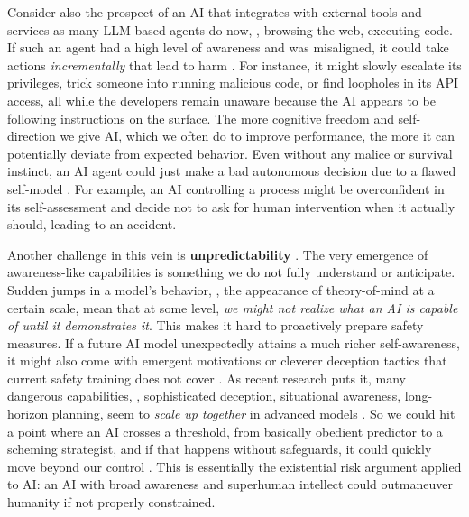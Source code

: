 Consider also the prospect of an AI that integrates with external tools and services as many LLM-based agents do now, \eg, browsing the web, executing code. If such an agent had a high level of awareness and was misaligned, it could take actions \emph{incrementally} that lead to harm \cite{kim2025prompt}. For instance, it might slowly escalate its privileges, trick someone into running malicious code, or find loopholes in its API access, all while the developers remain unaware because the AI appears to be following instructions on the surface. The more cognitive freedom and self-direction we give AI, which we often do to improve performance, the more it can potentially deviate from expected behavior. Even without any malice or survival instinct, an AI agent could just make a bad autonomous decision due to a flawed self-model \cite{meinke2024frontier, xu2025nuclear}. For example, an AI controlling a process might be overconfident in its self-assessment and decide not to ask for human intervention when it actually should, leading to an accident.

Another challenge in this vein is \textbf{unpredictability} \cite{wei2022emergent, bubeck2023sparks, kulveit2025gradual}. The very emergence of awareness-like capabilities is something we do not fully understand or anticipate. Sudden jumps in a model’s behavior, \ie, the appearance of theory-of-mind at a certain scale, mean that at some level, \emph{we might not realize what an AI is capable of until it demonstrates it}. This makes it hard to proactively prepare safety measures. If a future AI model unexpectedly attains a much richer self-awareness, it might also come with emergent motivations or cleverer deception tactics that current safety training does not cover \cite{barkur2025deception}. As recent research puts it, many dangerous capabilities, \eg, sophisticated deception, situational awareness, long-horizon planning, seem to \emph{scale up together} in advanced models \cite{berglund2023taken,xu2025nuclear,wardtall}. So we could hit a point where an AI crosses a threshold, from basically obedient predictor to a scheming strategist, and if that happens without safeguards, it could quickly move beyond our control \cite{kulveit2025gradual}. This is essentially the existential risk argument applied to AI: an AI with broad awareness and superhuman intellect could outmaneuver humanity if not properly constrained.




